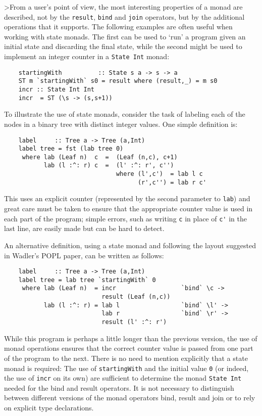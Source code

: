 >From a user's point of view, the most interesting properties of a monad
are described, not by the \verb"result", \verb"bind" and \verb"join" operators, but by the
additional operations that it supports.  The following examples are
often useful when working with state monads.  The first can be used to
`run' a program given an initial state and discarding the final state,
while the second might be used to implement an integer counter in a
\verb"State Int" monad:
\begin{verbatim}
    startingWith          :: State s a -> s -> a
    ST m `startingWith` s0 = result where (result,_) = m s0
    incr :: State Int Int
    incr  = ST (\s -> (s,s+1))
\end{verbatim}
To illustrate the use of state monads, consider the task of labeling
each of the nodes in a binary tree with distinct integer values.  One
simple definition is:
\begin{verbatim}
    label     :: Tree a -> Tree (a,Int)
    label tree = fst (lab tree 0)
     where lab (Leaf n)  c  =  (Leaf (n,c), c+1)
           lab (l :^: r) c  =  (l' :^: r', c'')
                               where (l',c')  = lab l c
                                     (r',c'') = lab r c'
\end{verbatim}
This uses an explicit counter (represented by the second parameter to
\verb"lab") and great care must be taken to ensure that the appropriate
counter value is used in each part of the program; simple errors, such
as writing \verb"c" in place of \verb"c'" in the last line, are easily made but can
be hard to detect.

An alternative definition, using a state monad and following the
layout suggested in Wadler's POPL paper, can be written as follows:
\begin{verbatim}
    label     :: Tree a -> Tree (a,Int)
    label tree = lab tree `startingWith` 0
     where lab (Leaf n)  = incr                  `bind` \c ->
                           result (Leaf (n,c))
           lab (l :^: r) = lab l                 `bind` \l' ->
                           lab r                 `bind` \r' ->
                           result (l' :^: r')
\end{verbatim}
While this program is perhaps a little longer than the previous
version, the use of monad operations ensures that the correct counter
value is passed from one part of the program to the next.  There is no
need to mention explicitly that a state monad is required: The use of
\verb"startingWith" and the initial value \verb"0" (or indeed, the use of \verb"incr" on its
own) are sufficient to determine the monad \verb"State Int" needed for the
bind and result operators.  It is not necessary to distinguish between
different versions of the monad operators bind, result and join or to
rely on explicit type declarations.


